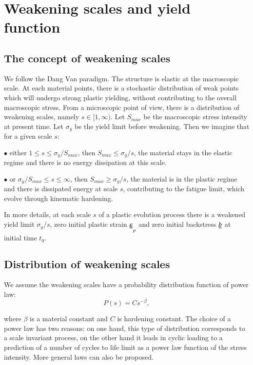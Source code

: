 \documentclass[3p,times,number,review]{elsarticle}
\begin{document}
\clearpage

\section{Weakening scales and yield function}
\subsection{The concept of weakening scales} 

We follow the Dang Van paradigm. The structure is elastic at the macroscopic scale. At each material points, there is a stochastic distribution of weak points which will undergo strong plastic yielding, without contributing to the overall macroscopic stress. From a microscopic point of view, there is a distribution of weakening scales, namely $s\in[1,\infty)$. Let $S_{max}$ be the macroscopic stress intensity at present time. Let $\sigma_y$ be the yield limit before weakening. Then we imagine that for a given scale $s$:

\vspace{6pt}
\noindent
$\bullet$ either $1\leqslant s\leqslant \sigma_y/S_{max}$, then $S_{max}\leqslant \sigma_y/s$, the material stays in the elastic regime and there is no energy dissipation at this scale.

\vspace{6pt}
\noindent
$\bullet$ or $\sigma_y/S_{max}\leqslant s\leqslant \infty$, then $S_{max}\geqslant \sigma_y/s$, the material is in the plastic regime and there is dissipated energy at scale $s$, contributing to the fatigue limit, which evolve through kinematic hardening.

In more details, at each scale $s$ of a plastic evolution process there is a weakened yield limit $\sigma_y/s$, zero initial plastic strain $\uuline{\varepsilon}_p$ and zero initial backstress $\uuline{b}$ at initial time $t_0$.


\vspace{6pt}

\subsection{Distribution of weakening scales}

We assume the weakening scales have a  probability distribution function of power law:
$$P(s) = Cs^{-\beta},$$

where $\beta$ is a material constant and $C$ is hardening constant. 
The choice of a power law has two reasons: on one hand, this type of distribution corresponds to a scale invariant process, on the other hand it leads in cyclic loading to a prediction of a number of cycles to life limit as a power law function of the stress intensity. More general laws can also be proposed.
\end{document}
